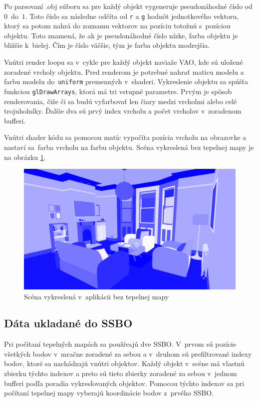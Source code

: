 Po parsovaní .obj súboru sa pre každý objekt vygeneruje pseudonáhodné číslo od $0$~do~$1$. Toto číslo sa následne odčíta od \verb|r| a \verb|g| hodnôt jednotkového vektoru, ktorý sa potom nahrá do zoznamu vektorov na pozíciu totožnú s~pozíciou objektu. Toto znamená, že ak je pseudonáhodné číslo nízke, farba objektu je bližšie k~bielej. Čím je číslo väčšie, tým je farba objektu modrejšia.

Vnútri render loopu sa v~cykle pre každý objekt naviaže VAO, kde sú uložené zoradené vrcholy objektu. Pred renderom je potrebné nahrať maticu modelu a farbu modelu do~\verb|uniform| premenných v~shaderi. Vykreslenie objektu sa spúšťa funkciou \verb|glDrawArrays|, ktorá má tri vstupné parametre. Prvým je spôsob renderovania, čiže či sa budú vyfarbovať len čiary medzi vrcholmi alebo celé trojuholníky. Ďalšie dva sú prvý index vrcholu a počet vrcholov v~zoradenom bufferi.

Vnútri shader kódu sa pomocou matíc vypočíta pozícia vrcholu na obrazovke a nastaví sa~farba vrcholu na farbu objektu. Scéna vykreslená bez tepelnej mapy je na obrázku \ref{scenaBlue}.

\begin{figure}[t!]\label{scenaBlue}
    \centering
    \includegraphics[width=0.80\linewidth]{obrazky-figures/scenaBlue.png}
    \caption{Scéna vykreslená v~aplikácii bez tepelnej mapy}
\end{figure}

\subsection*{Dáta ukladané do SSBO}
Pri počítaní tepelných mapách sa používajú dve SSBO. V~prvom sú pozície všetkých bodov v~mračne zoradené za sebou a v~druhom sú prefiltrované indexy bodov, ktoré sa nachádzajú vnútri objektov. Každý objekt v~scéne má vlastnú zbierku týchto indexov a preto sú tieto zbierky zoradené za sebou v~jednom bufferi podľa poradia vykresľovaných objektov. Pomocou týchto indexov sa pri počítaní tepelnej mapy vyberajú koordinácie bodov z~prvého SSBO.

